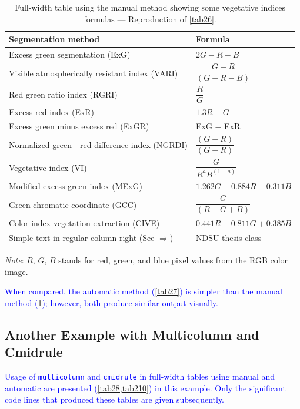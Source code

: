 \documentclass[phd]{ndsu-thesis-2022}
\newcommand\italk[1]{\textcolor{blue}{#1}}  %
\newcommand\vb[1]{\textcolor{blue}{\texttt{#1}}}%
\begin{document}
\begin{table}[t]
\caption{Full-width table using the manual method showing some vegetative indices formulas --- Reproduction of \cref{tab26}.}
\setlength{\tabcolsep}{7ex}
\begin{tabular}{@{\:}l l@{\:}}
\toprule
Segmentation method  & Formula  \\
\midrule
Excess green segmentation (ExG)    				& $2G - R - B$\\[1ex]
Visible atmospherically resistant index (VARI) 		& $\dfrac{{G - R}}
{(G + R - B)}$ \\[2ex]
Red green ratio index (RGRI) 					& $\dfrac{R}{G}$\\[2ex]
Excess red index (ExR) 						& $1.3R - G$\\[2ex]
Excess green minus excess red (ExGR) 			& \text ExG $-$ ExR\\[2ex]
Normalized green - red difference index (NGRDI)	& $\dfrac{(G - R)}{(G + R)}$\\[2ex]
Vegetative index (VI) 						& $\dfrac{G}{R^a B^{(1-a)}}$\\[3ex]
Modified excess green index (MExG) 			& $ 1.262G - 0.884R - 0.311B$\\[2ex]
Green chromatic coordinate (GCC) 				& $\dfrac{G}{(R + G + B)}$\\[2ex]
Color index vegetation extraction (CIVE) 			& $0.441R - 0.811G + 0.385B$\\[2ex]
Simple text in regular column right (See $\Rightarrow$) & NDSU thesis class\\
\bottomrule
\end{tabular}
\begin{tablenotes}[flushleft]
\footnotesize
\item \hspace{-1ex} \emph{Note}: $R$, $G$, $B$ stands for red, green, and blue pixel values from the RGB color image.
\label{tab28}
\end{tablenotes}
\end{table}

\italk{When compared, the automatic method (\cref{tab27}) is simpler than the manual method (\cref{tab28}); however, both produce similar output visually.} 

\kant[9]
\subsection{Another Example with Multicolumn and Cmidrule}
\italk{Usage of \vb{multicolumn} and \vb{cmidrule} in full-width tables using manual and automatic are presented (\cref{tab28,tab210}) in this example. Only the significant code lines that produced these tables are given subsequently.} 
\end{document}
